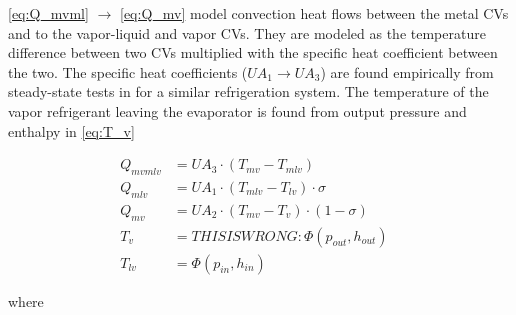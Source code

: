 \medskip
\cref{eq:Q_mvml} $\rightarrow$ \cref{eq:Q_mv} model convection heat flows between the metal CVs and to the vapor-liquid and vapor CVs. They are modeled as the temperature difference between two CVs multiplied with the specific heat coefficient between the two. The specific heat coefficients ($U A_1 \rightarrow U A_3$) are found empirically from steady-state tests in \cite{Sorensen2013} for a similar refrigeration system. The temperature of the vapor refrigerant leaving the evaporator is found from output pressure and enthalpy in \cref{eq:T_v}

\begin{align}
	Q_{mvmlv} & = U A_3 \cdot (T_{mv} - T_{mlv}) \label{eq:Q_mvml}             &  \\
	Q_{mlv}   & = U A_1 \cdot (T_{mlv} - T_{lv}) \cdot \sigma	\label{eq:Q_ml}&  \\
	Q_{mv}    & = U A_2 \cdot (T_{mv} - T_v) \cdot (1- \sigma) \label{eq:Q_mv} &  \\
	T_v       & = THIS IS WRONG: \Phi(p_{out}, h_{out}) \label{eq:T_v}                        &  \\
	T_{lv}    & = \Phi(p_{in}, h_{in}) \label{eq:T_v}                          &
\end{align}

where

